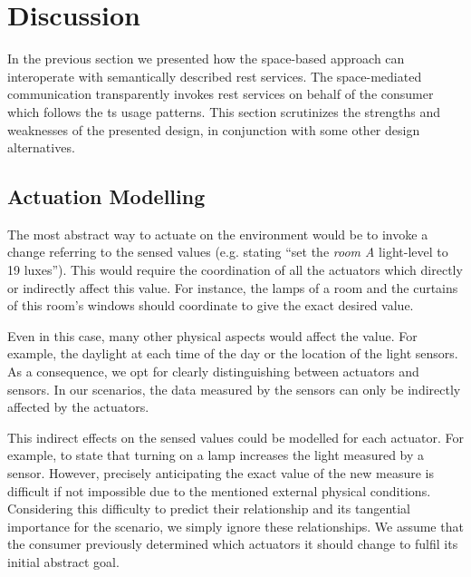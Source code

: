 \section{Discussion}
\label{sec:actuation_discussion}


In the previous section we presented how the space-based approach can interoperate with semantically described \ac{rest} services.
The space-mediated communication transparently invokes \ac{rest} services on behalf of the consumer which follows the \ac{ts} usage patterns.
This section scrutinizes the strengths and weaknesses of the presented design, in conjunction with some other design alternatives. %




\subsection{Actuation Modelling}

The most abstract way to actuate on the environment would be to invoke a change referring to the sensed values (e.g. stating ``set the \emph{room A} light-level to 19 luxes'').
This would require the coordination of all the actuators which directly or indirectly affect this value.
For instance, the lamps of a room and the curtains of this room's windows should coordinate to give the exact desired value.


Even in this case, many other physical aspects would affect the value.
For example, the daylight at each time of the day or the location of the light sensors.
As a consequence, we opt for clearly distinguishing between actuators and sensors.
In our scenarios, the data measured by the sensors can only be indirectly affected by the actuators.


This indirect effects on the sensed values could be modelled for each actuator.
For example, to state that turning on a lamp increases the light measured by a sensor.
However, precisely anticipating the exact value of the new measure is difficult if not impossible due to the mentioned external physical conditions.
Considering this difficulty to predict their relationship and its tangential importance for the scenario, we simply ignore these relationships.
We assume that the consumer previously determined which actuators it should change to fulfil its initial abstract goal.


